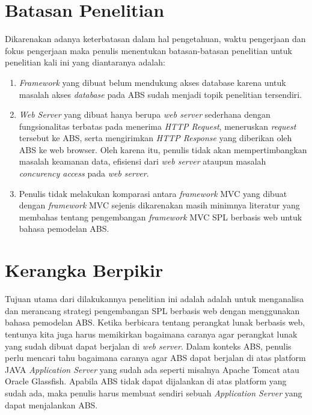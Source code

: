 \section{Batasan Penelitian}

Dikarenakan adanya keterbatasan dalam hal pengetahuan, waktu pengerjaan dan fokus pengerjaan maka penulis menentukan batasan-batasan penelitian untuk penelitian kali ini yang diantaranya adalah:

\begin{enumerate}
    \item \textit{Framework} yang dibuat belum mendukung akses database karena untuk masalah akses \textit{database} pada ABS sudah menjadi topik penelitian tersendiri.
    \item \textit{Web Server} yang dibuat hanya berupa \textit{web server} sederhana dengan fungsionalitas terbatas pada menerima \textit{HTTP Request}, meneruskan \textit{request} tersebut ke ABS, serta mengirimkan \textit{HTTP Response} yang diberikan oleh ABS ke web browser. Oleh karena itu, penulis tidak akan mempertimbangkan masalah keamanan data, efisiensi dari \textit{web server} ataupun masalah \textit{concurency access} pada \textit{web server}.
    \item Penulis tidak melakukan komparasi antara \textit{framework} MVC yang dibuat dengan \textit{framework} MVC sejenis dikarenakan masih minimnya literatur yang membahas tentang pengembangan \textit{framework} MVC SPL berbasis web untuk bahasa pemodelan ABS.
\end{enumerate}

\section{Kerangka Berpikir}
\noindent
Tujuan utama dari dilakukannya penelitian ini adalah adalah untuk menganalisa dan merancang strategi pengembangan SPL berbasis web dengan menggunakan bahasa pemodelan ABS. Ketika berbicara tentang perangkat lunak berbasis web, tentunya kita juga harus memikirkan bagaimana caranya agar perangkat lunak yang sudah dibuat dapat berjalan di \textit{web server}. Dalam konteks ABS, penulis perlu mencari tahu bagaimana caranya agar ABS dapat berjalan di atas platform JAVA \textit{Application Server} yang sudah ada seperti misalnya Apache Tomcat atau Oracle Glassfish. Apabila ABS tidak dapat dijalankan di atas platform yang sudah ada, maka penulis harus membuat sendiri sebuah \textit{Application Server} yang dapat menjalankan ABS.

